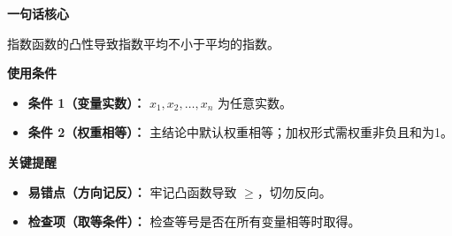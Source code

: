 \begin{summarybox}
\textbf{\textcolor{CSummary}{一句话核心}}

指数函数的凸性导致指数平均不小于平均的指数。

\medskip
\textbf{\textcolor{CSummary}{使用条件}}
\begin{itemize}[leftmargin=*, itemsep=0.5em, topsep=0.4em]
    \item \textbf{条件 1（变量实数）：} $x_1, x_2, \dots, x_n$ 为任意实数。
    \item \textbf{条件 2（权重相等）：} 主结论中默认权重相等；加权形式需权重非负且和为1。
\end{itemize}

\medskip
\textbf{\textcolor{CSummary}{关键提醒}}
\begin{itemize}[leftmargin=*, itemsep=0.5em, topsep=0.4em]
    \item \textbf{易错点（方向记反）：} 牢记凸函数导致 $\geq$，切勿反向。
    \item \textbf{检查项（取等条件）：} 检查等号是否在所有变量相等时取得。
\end{itemize}
\end{summarybox}
